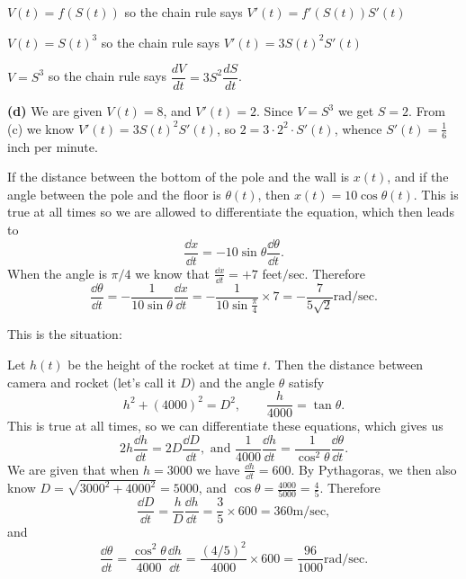 $V(t) = f(S(t))$ so the chain rule says $V'(t) = f'(S(t)) S'(t)$




$V(t) = S(t)^3$ so the chain rule says $V'(t) = 3S(t)^2 S'(t)$




$V=S^3$ so the chain rule says $\dfrac{dV}{dt} =
3S^2\dfrac{dS}{dt}$.




\textbf{(d)} We are given $V(t) = 8$, and $V'(t)=2$.  Since $V=S^3$
we get $S=2$.  From (c) we know $V'(t)=3S(t)^2 S'(t)$, so $2 =
3\cdot 2^2\cdot S'(t)$, whence $S'(t) = \frac16$ inch per minute.
\bigskip

\item[{\bfseries(IV17.3)}]

If the distance between the bottom of the pole and the wall is $x(t)$,
and if the angle between the pole and the floor is $\theta(t)$, then
$x(t) = 10 \cos \theta(t)$.  This is true at all times so we are
allowed to differentiate the equation, which then leads to
\[
\frac{\dd x} {\dd t} = -10\sin\theta \frac{\dd \theta} {\dd t}.
\]
When the angle is $\pi/4$ we know that $\frac{\dd x} {\dd t} = +7$ feet$/$sec.
Therefore
\[
\frac{\dd \theta} {\dd t}
= -\frac{1} {10\sin\theta} \frac{\dd x} {\dd t}
= -\frac{1} {10\sin\frac\pi4} \times 7
= - \frac{7} {5\surd 2} \mathrm{rad}/\mathrm{sec}.
\]
\bigskip

\item[{\bfseries(IV17.5)}]

This is the situation:
\begin{center}
  
\end{center}
Let $h(t)$ be the height of the rocket at time $t$.  Then the distance between
camera and rocket (let's call it $D$) and the angle $\theta$ satisfy
\[
h^2+ (4000)^2 = D^2, \qquad
\frac{h} {4000} = \tan \theta.
\]
This is true at all times, so we can differentiate these equations, which gives us
\[
2h\frac{\dd h} {\dd t} = 2D\frac{\dd D} {\dd t},
\text{ and }
\frac{1} {4000}\frac{\dd h} {\dd t}
= \frac{1} {\cos^2\theta} \frac{\dd\theta} {\dd t}.
\]
We are given that when $h=3000$ we have $\frac{\dd h} {\dd t} = 600$.
By Pythagoras, we then also know $D=\sqrt{3000^2 + 4000^2} = 5000$,
and $\cos \theta = \frac{4000} {5000} = \frac{4} {5}$.
Therefore
\[
\frac{\dd D} {\dd t}
= \frac{h} {D}\frac{\dd h} {\dd t}
= \frac{3} {5}\times 600
= 360  \mathrm{m}/\mathrm{sec},
\]
and
\[
\frac{\dd \theta} {\dd t}
= \frac{\cos^2\theta} {4000} \frac{\dd h} {\dd t}
= \frac{(4/5)^2} {4000}\times600
= \frac{96} {1000}  \mathrm{rad}/\mathrm{sec}.
\]
\bigskip

